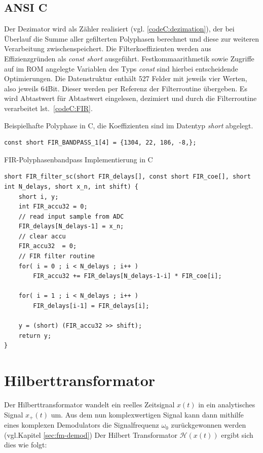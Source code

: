 \documentclass{article}
\begin{document}
\subsection{ANSI C}
Der Dezimator wird als Zähler realisiert (vgl. \ref{codeC:dezimation}), der bei Überlauf die Summe aller gefilterten Polyphasen berechnet und diese zur weiteren Verarbeitung zwischenspeichert. Die Filterkoeffizienten werden aus Effizienzgründen als \textit{const short} ausgeführt. Festkommaarithmetik sowie Zugriffe auf im ROM angelegte Variablen des Typs \textit{const} sind hierbei entscheidende Optimierungen.
Die Datenstruktur enthält 527 Felder mit jeweils vier Werten, also jeweils 64Bit. Dieser werden per Referenz der Filterroutine übergeben. Es wird Abtastwert für Abtastwert eingelesen, dezimiert und durch die Filterroutine verarbeitet lst.~\ref{codeC:FIR}.
\begin{listing}\label{codeC:dezimation}
    \caption{Beispielhafte Polyphase in C, die Koeffizienten sind im Datentyp \textit{short} abgelegt.}
    \begin{verbatim}
const short FIR_BANDPASS_1[4] = {1304, 22, 186, -8,};
    \end{verbatim}
\end{listing}
\begin{listing}\label{codeC:FIR}
    \caption{FIR-Polyphasenbandpass Implementierung in C}
    \begin{verbatim}
short FIR_filter_sc(short FIR_delays[], const short FIR_coe[], short int N_delays, short x_n, int shift) {
    short i, y;
    int FIR_accu32 = 0;
    // read input sample from ADC
    FIR_delays[N_delays-1] = x_n;	 
    // clear accu
    FIR_accu32	= 0;
    // FIR filter routine				
    for( i = 0 ; i < N_delays ; i++ )		
        FIR_accu32 += FIR_delays[N_delays-1-i] * FIR_coe[i];
    
    for( i = 1 ; i < N_delays ; i++ )				
        FIR_delays[i-1] = FIR_delays[i];

    y = (short) (FIR_accu32 >> shift);
    return y;
}
    \end{verbatim}
\end{listing}

\section{Hilberttransformator}\label{sec:hilbert}
Der Hilberttransformator wandelt ein reelles Zeitsignal $x(t)$ in ein analytisches Signal $x_+(t)$ um.
Aus dem nun komplexwertigen Signal kann dann mithilfe eines komplexen Demodulators die Signalfrequenz $\omega_0$ zurückgewonnen werden (vgl.Kapitel \ref{sec:fm-demod})
Der Hilbert Transformator $\mathcal{H}(x(t))$ ergibt sich dies wie folgt:
\end{document}
